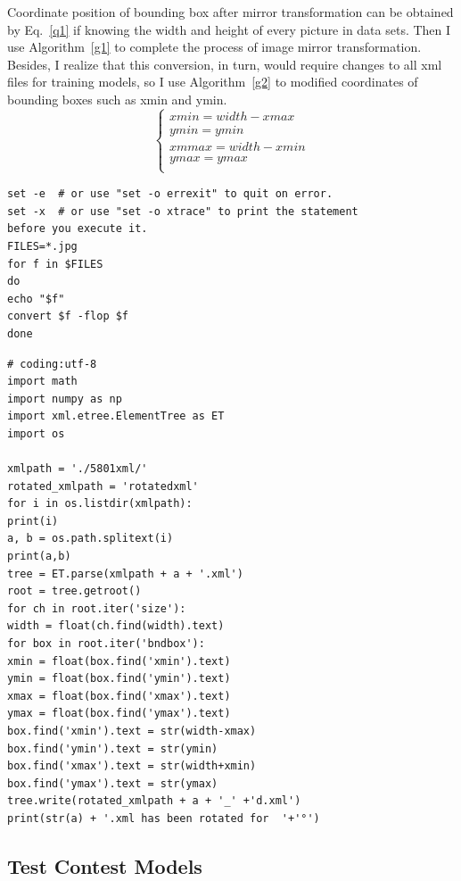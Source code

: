 \documentclass[a4paper]{article}
\begin{document}
	Coordinate position of bounding box after mirror transformation can be obtained by Eq.~\ref{q1} if knowing the width and height of every picture in data sets. Then I use Algorithm~\ref{g1} to complete the process of image mirror transformation. Besides, I realize that this conversion, in turn, would require changes to all xml files for training models, so I use Algorithm~\ref{g2} to modified coordinates of bounding boxes such as xmin and ymin.
	\begin{equation}
	\begin{cases}
	xmin = width-xmax\\
	ymin =ymin\\
	xmmax = width-xmin\\
	ymax = ymax\\
	\end{cases} \label{q1}
	\end{equation}
	
\lstset{language=python}
\begin{lstlisting}
set -e  # or use "set -o errexit" to quit on error.
set -x  # or use "set -o xtrace" to print the statement 
before you execute it.	
FILES=*.jpg
for f in $FILES
do
echo "$f"
convert $f -flop $f
done
\end{lstlisting}\label{g1}
	
\lstset{language=python}
\begin{lstlisting}
# coding:utf-8
import math
import numpy as np
import xml.etree.ElementTree as ET
import os
	
xmlpath = './5801xml/'         
rotated_xmlpath = 'rotatedxml'
for i in os.listdir(xmlpath):
print(i)
a, b = os.path.splitext(i)  
print(a,b)                          
tree = ET.parse(xmlpath + a + '.xml')
root = tree.getroot()
for ch in root.iter('size'):
width = float(ch.find(width).text)
for box in root.iter('bndbox'):
xmin = float(box.find('xmin').text)
ymin = float(box.find('ymin').text)
xmax = float(box.find('xmax').text)
ymax = float(box.find('ymax').text)
box.find('xmin').text = str(width-xmax)
box.find('ymin').text = str(ymin)
box.find('xmax').text = str(width+xmin)
box.find('ymax').text = str(ymax)
tree.write(rotated_xmlpath + a + '_' +'d.xml')
print(str(a) + '.xml has been rotated for  '+'°')
\end{lstlisting}\label{g2}
	
	\subsection{Test Contest Models}
	
\end{document}
